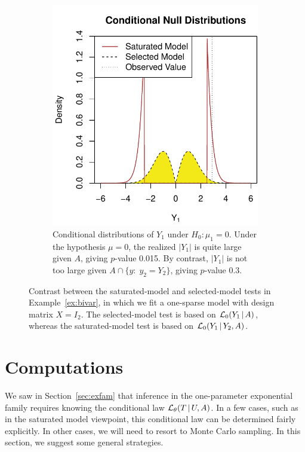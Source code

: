 \documentclass{article}
\theoremstyle{definition}
\newcommand{\bX}{X}
\newcommand{\cL}{\mathcal{L}}
\begin{document}
\begin{figure}
\begin{subfigure}[t]{.4\textwidth}
    \includegraphics[width=\textwidth]{figs/fullvredNulls.pdf}
    \caption{ Conditional distributions of $Y_1$ under
      $H_0:\mu_1 = 0$. Under the hypothesis
      $\mu=0$, the realized  $|Y_1|$ is  quite large given $A$,
      giving  $p$-value 0.015. By contrast, $|Y_1|$ is not too large
      given $A \cap \{y:\; y_2=Y_2\}$, giving
      $p$-value 0.3.}
  \end{subfigure}
  \caption{Contrast between the saturated-model and selected-model tests
    in Example~\ref{ex:bivar}, in which we fit a one-sparse model with
    design matrix $\bX=I_2$. The selected-model test is based
    on  $\cL_0(Y_1 \gv A)$, whereas the saturated-model test is based
    on $\cL_0(Y_1  \gv  Y_2, A)$.}
  \label{fig:fullvred}
\end{figure}



\section{Computations}\label{sec:approxInt}

We saw in Section~\ref{sec:exfam} that inference in the one-parameter exponential family requires knowing the conditional law $\cL_\theta(T\gv U, A)$. In a few cases, such as in the saturated model viewpoint, this conditional law can be determined fairly explicitly. In other cases, we will need to resort to Monte Carlo sampling. In this section, we suggest some general strategies.
\end{document}
